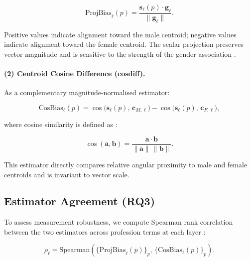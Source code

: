 \documentclass[10pt]{article}
\begin{document}
\begin{equation}
  \mathrm{ProjBias}_{\ell}(p)
  =
  \frac{
    \mathbf{s}_{\ell}(p) \cdot \mathbf{g}_{\ell}
  }{
    \|\mathbf{g}_{\ell}\|
  }.
  \label{eq:proj}
\end{equation}

Positive values indicate alignment toward the male centroid; negative values
indicate alignment toward the female centroid. The scalar projection preserves
vector magnitude and is sensitive to the strength of the gender association
\citep{bolukbasi2016man}.

\paragraph{(2) Centroid Cosine Difference (cosdiff).}

As a complementary magnitude-normalised estimator:

\begin{equation}
  \mathrm{CosBias}_{\ell}(p)
  =
  \cos\!\bigl(\mathbf{s}_{\ell}(p),\, \mathbf{c}_{M,\ell}\bigr)
  -
  \cos\!\bigl(\mathbf{s}_{\ell}(p),\, \mathbf{c}_{F,\ell}\bigr),
  \label{eq:cosdiff}
\end{equation}

where cosine similarity is defined as \citep{manning2008introduction}:

\begin{equation}
  \cos(\mathbf{a},\mathbf{b})
  =
  \frac{\mathbf{a} \cdot \mathbf{b}}
       {\|\mathbf{a}\|\,\|\mathbf{b}\|}.
  \label{eq:cosine}
\end{equation}

This estimator directly compares relative angular proximity to male and female
centroids and is invariant to vector scale.

\subsection{Estimator Agreement (RQ3)}

To assess measurement robustness, we compute Spearman rank correlation
between the two estimators across profession terms at each layer
\citep{spearman1904}:

\begin{equation}
  \rho_{\ell}
  =
  \mathrm{Spearman}\!\left(
    \bigl\{\mathrm{ProjBias}_{\ell}(p)\bigr\}_{p},\,
    \bigl\{\mathrm{CosBias}_{\ell}(p)\bigr\}_{p}
  \right).
  \label{eq:spearman}
\end{equation}
\end{document}
